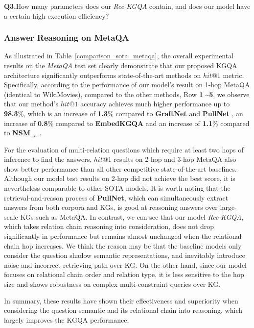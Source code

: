 \documentclass[pdflatex,sn-mathphys]{sn-jnl}%
\theoremstyle{thmstyleone}%
\theoremstyle{thmstyletwo}%
\theoremstyle{thmstylethree}%
\begin{document}
\textbf{Q3.}\quad How many parameters does our \textit{Rce-KGQA} contain, and does our model have a certain high execution efficiency?

\subsubsection{Answer Reasoning on MetaQA}
\label{ar_metaqa}
As illustrated in Table~\ref{comparison_sota_metaqa}, the overall experimental results on the \textit{MetaQA} test set clearly demonstrate that our proposed KGQA architecture significantly outperforms state-of-the-art methods on $hit@1$ metric. Specifically, according to the performance of our model's result on 1-hop MetaQA (identical to WikiMovies), compared to the other methods, Row \textbf{1} \textasciitilde \textbf{5}, we observe that our method's $hit@1$ accuracy achieves much higher performance up to \textbf{98.3}\%, which is an increase of \textbf{1.3}\% compared to \textbf{GraftNet} \cite{sun2018graftnet} and \textbf{PullNet} \cite{pullnet}, an increase of \textbf{0.8}\% compared to \textbf{EmbedKGQA} \cite{apoorv2020embedKGQA} and an increase of \textbf{1.1}\% compared to \textbf{NSM}$_{+h}$ \cite{he2021stu-teaQA}.

For the evaluation of multi-relation questions which require at least two hops of inference to find the answers, $hit@1$ results on 2-hop and 3-hop MetaQA also show better performance than all other competitive state-of-the-art baselines. Although our model test results on 2-hop did not achieve the best score, it is nevertheless comparable to other SOTA models. It is worth noting that the retrieval-and-reason process of \textbf{PullNet}, which can simultaneously extract answers from both corpora and KGs, is good at reasoning answers over large-scale KGs such as MetaQA. In contrast, we can see that our model \textit{Rce-KGQA}, which takes relation chain reasoning into consideration, does not drop significantly in performance but remains almost unchanged when the relational chain hop increases. We think the reason may be that the baseline models only consider the question shadow semantic representations, and inevitably introduce noise and incorrect retrieving path over KG. On the other hand, since our model focuses on relational chain order and relation type, it is less sensitive to the hop size and shows robustness on complex multi-constraint queries over KG. 

In summary, these results have shown their effectiveness and superiority when considering the question semantic and its relational chain into reasoning, which largely improves the KGQA performance. 
\end{document}
